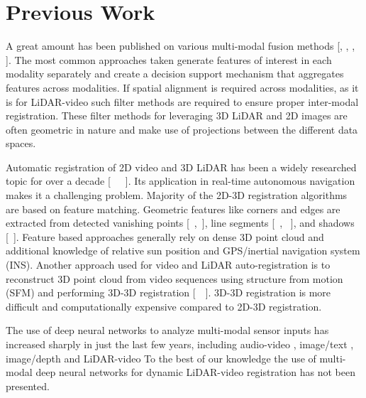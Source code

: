 \documentclass{article}
\begin{document}

\section{Previous Work} %
\label{sec:previous_work}


A great amount has been published on various multi-modal fusion methods [\cite{Ross2003Informatio}, \cite{Gregor2011Learning-R}, \cite{Wu2004Optimal-Mu}, \cite{Snoek2006The-Challe}]. The most common approaches taken generate features of interest in each modality separately and create a decision support mechanism that aggregates features across modalities. If spatial alignment is required across modalities, as it is for LiDAR-video such filter methods \cite{Thrun2011Googles-dr} are required to ensure proper inter-modal registration. These filter methods for leveraging 3D LiDAR and 2D images are often geometric in nature and make use of projections between the different data spaces. 

Automatic registration of 2D video and 3D LiDAR has been a widely researched topic for over a decade [\cite{ Wang2009A-Robust-A}~\cite{Kim2014Automatic-}~\cite{Mastin2009Automatic-}~\cite{Bodensteiner2012Real-time-}]. Its application in real-time autonomous navigation makes it a challenging problem. Majority of the 2D-3D registration algorithms are based on feature matching. Geometric features like corners and edges are extracted from detected vanishing points [~\cite{Liu2007-Vanishing-points},~\cite{Ding2008-Vanishing-point}], line segments [~\cite{Frueh2004-Linesegment}, ~\cite{Stamos2008-Linesegment}], and shadows [~\cite{Troccoli2004-ashadow}]. Feature based approaches generally rely on dense 3D point cloud and additional knowledge of relative sun position and GPS/inertial navigation system (INS). Another approach used for video and LiDAR auto-registration is to reconstruct 3D point cloud from video sequences using structure from motion (SFM) and performing 3D-3D registration [~\cite{Zhao2004-alignment-3Dcloud}~\cite{Liu2006-alignment-sfm}]. 3D-3D registration is more difficult and computationally expensive compared to 2D-3D registration. 

The use of deep neural networks to analyze multi-modal sensor inputs  has increased sharply in just the last few years, including audio-video \cite{Ngiam2011Multimodal} \cite{Kim2013Deep-Learn}, image/text \cite{Srivastava2012Multimodal}, image/depth \cite{Lenz2013Deep-Learn} and LiDAR-video To the best of our knowledge the use of multi-modal deep neural networks for dynamic LiDAR-video registration has not been presented.
\end{document}
